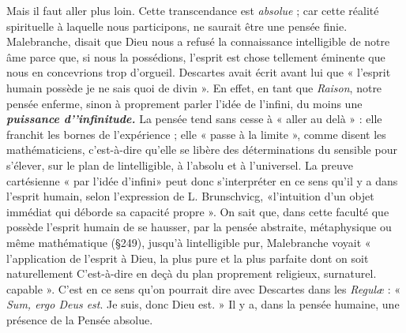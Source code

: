 Mais il faut aller plus loin. Cette transcendance est {\it absolue} ; car cette
réalité spirituelle à laquelle nous participons, ne saurait être une pensée
finie. Malebranche, disait que Dieu nous a refusé la connaissance
intelligible de notre âme parce que, si nous la possédions, l'esprit est
chose tellement éminente que nous en concevrions trop d’orgueil.
Descartes avait écrit avant lui que « l'esprit humain possède je ne
sais quoi de divin ». En effet, en tant que {\it Raison}, notre pensée
enferme, sinon à proprement parler l'idée de l'infini, du moins une
\textbf{\textit {puissance d'’infinitude.}} La pensée tend sans cesse à « aller au delà » :
elle franchit les bornes de l’expérience ; elle « passe à la limite »,
comme disent les mathématiciens, c’est-à-dire qu’elle se libère des
déterminations du sensible pour s'élever, sur le plan de lintelligible,
à l’absolu et à l’universel. La preuve cartésienne « par l’idée
d’infini» peut donc s’interpréter en ce sens qu’il y a dans l'esprit
humain, selon l’expression de L. Brunschvicg, «l'intuition d’un
objet immédiat qui déborde sa capacité propre ». On sait que, dans
cette faculté que possède l’esprit humain de se hausser, par la pensée
abstraite, métaphysique ou même mathématique (\S 249), jusqu’à
lintelligible pur, Malebranche voyait « l’application de l’esprit à
Dieu, la plus pure et la plus parfaite dont on soit naturellement
{\footnotesize C'est-à-dire en deçà du plan proprement religieux, surnaturel.}
capable ». C’est en ce sens qu’on pourrait dire avec Descartes dans
les {\it Regulæ} : « {\it Sum, ergo Deus est}. Je suis, donc Dieu est. » Il y a, dans
la pensée humaine, une présence de la Pensée absolue.
